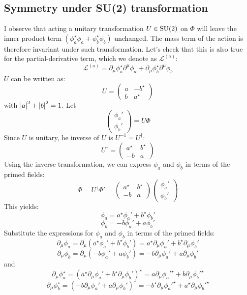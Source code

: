 \subsection{Symmetry under SU(2) transformation}
I observe that acting a unitary transformation $U\in {\rm SU}(2)$ on $\Phi$ will leave the inner product term $(\phi_a^\star \phi_a + \phi_b^\star \phi_b )$ unchanged. 
The mass term of the action is therefore invariant under such transformation. 
Let's check that this is also true for the partial-derivative term, which we denote as $\mathcal L^{(a)}$:
\[
    \mathcal L^{(a)} = \partial_\mu \phi_a^\star \partial^\mu \phi_a + \partial_\mu \phi_b^\star \partial^\mu \phi_b
\]
$U$ can be written as:
\[
U = \begin{pmatrix}
a & -b^\star \\ b & a^\star
 \end{pmatrix}
 \]
with $\abs{a}^2 + \abs{b}^2=1$. 
Let 
\[\begin{pmatrix}\phi_a' \\ \phi_b'\end{pmatrix} = U\Phi\]
Since $U$ is unitary, he inverse of \( U \) is
\( U^{-1} = U^\dagger \):
   \[
   U^\dagger = \begin{pmatrix}
   a^\star & b^\star \\ 
   -b & a
   \end{pmatrix}
   \]
Using the inverse transformation, we can express \(\phi_a\) and \(\phi_b\) in terms of the primed fields: 
   \[
   \Phi = U^\dagger \Phi' = \begin{pmatrix}
   a^\star & b^\star \\ 
   -b & a
   \end{pmatrix} \begin{pmatrix}
   \phi_a' \\ 
   \phi_b'
   \end{pmatrix}
   \]
   This yields:
   \[
   \phi_a = a^\star \phi_a' + b^\star \phi_b'
   \]
   \[
   \phi_b = -b \phi_a' + a \phi_b'
   \]
Substitute the expressions for \(\phi_a\) and \(\phi_b\) in terms of the primed fields:
   \[
   \partial_\mu \phi_a = \partial_\mu (a^\star \phi_a' + b^\star \phi_b') = a^\star \partial_\mu \phi_a' + b^\star \partial_\mu \phi_b'
   \]
   \[
   \partial_\mu \phi_b = \partial_\mu (-b \phi_a' + a \phi_b') = -b \partial_\mu \phi_a' + a \partial_\mu \phi_b'
   \]
   and
   \[
   \partial_\mu \phi_a^\star = (a^\star \partial_\mu \phi_a' + b^\star \partial_\mu \phi_b')^\star = a \partial_\mu \phi_a'^\star + b \partial_\mu \phi_b'^\star
   \]
   \[
   \partial_\mu \phi_b^\star = (-b \partial_\mu \phi_a' + a \partial_\mu \phi_b')^\star = -b^\star \partial_\mu \phi_a'^\star + a^\star \partial_\mu \phi_b'^\star
   \]
